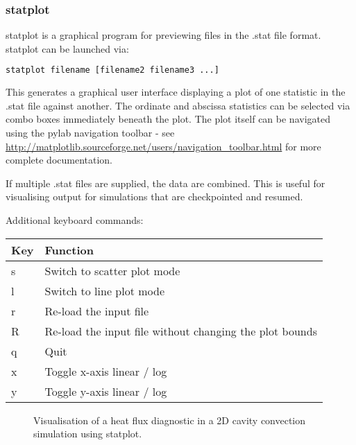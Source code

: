 \subsubsection{statplot}
\label{sec:statplot}

statplot is a graphical program for previewing files in the .stat file format.
statplot can be launched via:

\begin{lstlisting}[language = Bash]
statplot filename [filename2 filename3 ...]
\end{lstlisting}

This generates a graphical user interface displaying a plot of one statistic in
the .stat file against another. The ordinate and abscissa statistics can be
selected via combo boxes immediately beneath the plot. The plot itself can
be navigated using the pylab navigation toolbar - see
\url{http://matplotlib.sourceforge.net/users/navigation_toolbar.html} for
more complete documentation.

If multiple .stat files are supplied, the data are combined. This is useful for
visualising output for simulations that are checkpointed and resumed. 

Additional keyboard commands:

\begin{center}
  \begin{tabular}{| l | l |}
    \hline
    Key & Function \\
    \hline
    s   & Switch to scatter plot mode \\
    l   & Switch to line plot mode \\
    r   & Re-load the input file \\
    R   & Re-load the input file without changing the plot bounds \\
    q   & Quit \\
    x   & Toggle x-axis linear / log \\
    y   & Toggle y-axis linear / log \\
    \hline
  \end{tabular}
\end{center}

\begin{figure}[ht]
  \centering
  \caption{Visualisation of a heat flux diagnostic in a 2D cavity convection
           simulation using statplot.}
  \label{fig:statplot}
\end{figure}

